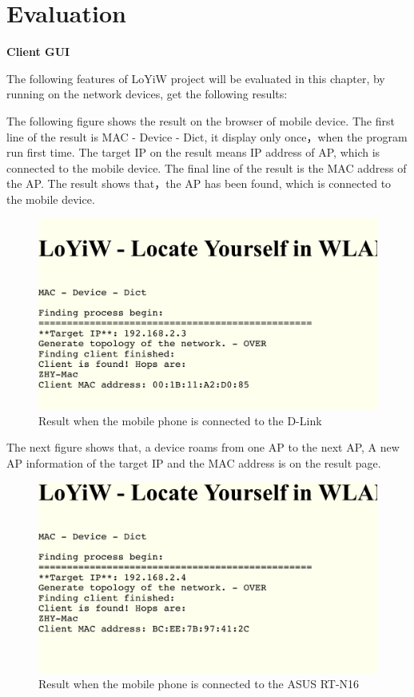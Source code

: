 \newpage
\chapter{Evaluation}

\textbf{Client GUI}

The following features of LoYiW project will be evaluated in this chapter, by running on the network devices, get the following results: 

The following figure shows the result on the browser of mobile device. The first line of the result is MAC - Device - Dict, it display only once，when the program run first time. The target IP on the result means IP address of AP, which is connected to the mobile device. The final line of the result is the MAC address of the AP. The result shows that，the AP has been found, which is connected to the mobile device.

\begin{figure}[!ht]
	\includegraphics[width=\textwidth]{images/loyiw-run1}
	\caption{Result when the mobile phone is connected to the D-Link}
\end{figure}

The next figure shows that, a device roams from one AP to the next AP,  A new AP information of the target IP and the MAC address is on the result page.

\begin{figure}[!ht]
	\includegraphics[width=\textwidth]{images/loyiw-run2}
	\caption{Result when the mobile phone is connected to the ASUS RT-N16}
\end{figure}


